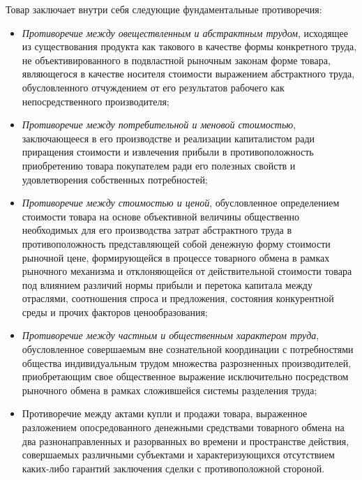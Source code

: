Товар заключает внутри себя следующие фундаментальные противоречия:
\begin{itemize}
    \item \textit{Противоречие между овеществленным и абстрактным трудом}, исходящее из существования продукта как такового в качестве формы конкретного труда, не объективированного в подвластной рыночным законам форме товара, являющегося в качестве носителя стоимости выражением абстрактного труда, обусловленного отчуждением от его результатов рабочего как непосредственного производителя;
    \item \textit{Противоречие между потребительной и меновой стоимостью}, заключающееся в его производстве и реализации капиталистом ради приращения стоимости и извлечения прибыли в противоположность приобретению товара покупателем ради его полезных свойств и удовлетворения собственных потребностей;
    \item \textit{Противоречие между стоимостью и ценой}, обусловленное определением стоимости товара на основе объективной величины общественно необходимых для его производства затрат абстрактного труда в противоположность представляющей собой денежную форму стоимости рыночной цене, формирующейся в процессе товарного обмена в рамках рыночного механизма и отклоняющейся от действительной стоимости товара под влиянием различий нормы прибыли и перетока капитала между отраслями, соотношения спроса и предложения, состояния конкурентной среды и прочих факторов ценообразования;
    \item \textit{Противоречие между частным и общественным характером труда}, обусловленное совершаемым вне сознательной координации с потребностями общества индивидуальным трудом множества разрозненных производителей, приобретающим свое общественное выражение исключительно посредством рыночного обмена в рамках сложившейся системы разделения труда;
    \item Противоречие между актами купли и продажи товара, выраженное разложением опосредованного денежными средствами товарного обмена на два разнонаправленных и разорванных во времени и пространстве действия, совершаемых различными субъектами и характеризующихся отсутствием каких-либо гарантий заключения сделки с противоположной стороной.
\end{itemize}

